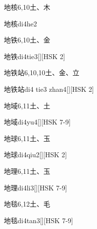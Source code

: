 \begin{Entry}{地核}{6,10}{⼟、⽊}
  \begin{Phonetics}{地核}{di4he2}
  \end{Phonetics}
\end{Entry}

\begin{Entry}{地铁}{6,10}{⼟、⾦}
  \begin{Phonetics}{地铁}{di4tie3}[][HSK 2]
  \end{Phonetics}
\end{Entry}

\begin{Entry}{地铁站}{6,10,10}{⼟、⾦、⽴}
  \begin{Phonetics}{地铁站}{di4 tie3 zhan4}[][HSK 2]
  \end{Phonetics}
\end{Entry}

\begin{Entry}{地域}{6,11}{⼟、⼟}
  \begin{Phonetics}{地域}{di4yu4}[][HSK 7-9]
  \end{Phonetics}
\end{Entry}

\begin{Entry}{地球}{6,11}{⼟、⽟}
  \begin{Phonetics}{地球}{di4qiu2}[][HSK 2]
  \end{Phonetics}
\end{Entry}

\begin{Entry}{地理}{6,11}{⼟、⽟}
  \begin{Phonetics}{地理}{di4li3}[][HSK 7-9]
  \end{Phonetics}
\end{Entry}

\begin{Entry}{地毯}{6,12}{⼟、⽑}
  \begin{Phonetics}{地毯}{di4tan3}[][HSK 7-9]
  \end{Phonetics}
\end{Entry}

